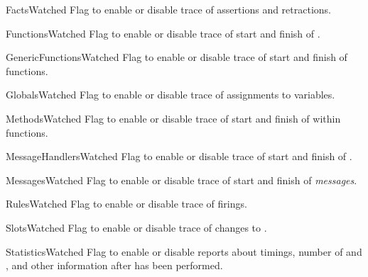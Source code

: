 \begin{memberdesc}[property]{FactsWatched}
Flag to enable or disable trace of  assertions and
retractions.
\end{memberdesc}

\begin{memberdesc}[property]{FunctionsWatched}
Flag to enable or disable trace of start and finish of .
\end{memberdesc}

\begin{memberdesc}[property]{GenericFunctionsWatched}
Flag to enable or disable trace of start and finish of 
functions.
\end{memberdesc}

\begin{memberdesc}[property]{GlobalsWatched}
Flag to enable or disable trace of assignments to 
variables.
\end{memberdesc}

\begin{memberdesc}[property]{MethodsWatched}
Flag to enable or disable trace of start and finish of 
within  functions.
\end{memberdesc}

\begin{memberdesc}[property]{MessageHandlersWatched}
Flag to enable or disable trace of start and finish of
.
\end{memberdesc}

\begin{memberdesc}[property]{MessagesWatched}
Flag to enable or disable trace of start and finish of \emph{messages}.
\end{memberdesc}

\begin{memberdesc}[property]{RulesWatched}
Flag to enable or disable trace of  firings.
\end{memberdesc}

\begin{memberdesc}[property]{SlotsWatched}
Flag to enable or disable trace of changes to 
.
\end{memberdesc}

\begin{memberdesc}[property]{StatisticsWatched}
Flag to enable or disable reports about timings, number of 
and , and other information after  has
been performed.
\end{memberdesc}

